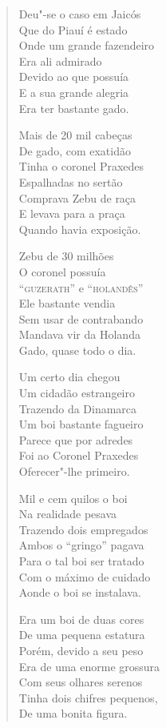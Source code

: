 \begin{verse}
Deu"-se o caso em Jaicós \\
Que do Piauí é estado \\
Onde um grande fazendeiro \\
Era ali admirado \\
Devido ao que possuía \\
E a sua grande alegria \\
Era ter bastante gado. 

Mais de 20 mil cabeças \\
De gado, com exatidão \\
Tinha o coronel Praxedes \\
Espalhadas no sertão \\
Comprava Zebu de raça \\
E levava para a praça \\
Quando havia exposição. 

Zebu de 30 milhões \\
O coronel possuía \\
``\textsc{guzerath}'' e ``\textsc{holandês}'' \\
Ele bastante vendia \\
Sem usar de contrabando \\
Mandava vir da Holanda \\
Gado, quase todo o dia. 


Um certo dia chegou \\
Um cidadão estrangeiro \\
Trazendo da Dinamarca \\
Um boi bastante fagueiro \\
Parece que por adredes \\
Foi ao Coronel Praxedes \\
Oferecer"-lhe primeiro. 

Mil e cem quilos o boi \\
Na realidade pesava \\
Trazendo dois empregados \\
Ambos o ``gringo'' pagava \\
Para o tal boi ser tratado \\
Com o máximo de cuidado \\
Aonde o boi se instalava. 

Era um boi de duas cores \\
De uma pequena estatura \\
Porém, devido a seu peso \\
Era de uma enorme grossura \\
Com seus olhares serenos \\
Tinha dois chifres pequenos, \\
De uma bonita figura. 


\end{verse}
